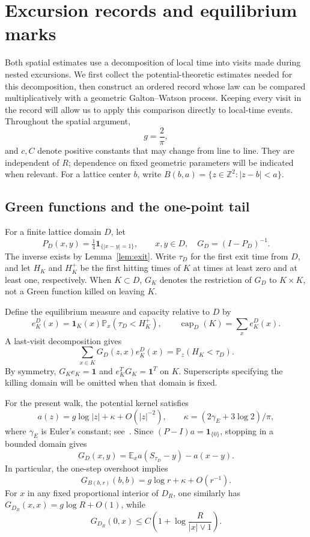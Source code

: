 \documentclass[11pt,a4paper]{article}
\numberwithin{equation}{section}
\theoremstyle{remark}
\begin{document}
\section{Excursion records and equilibrium marks}\label{sec:records}
Both spatial estimates use a decomposition of local time into visits made during nested excursions. We first collect the potential-theoretic estimates needed for this decomposition, then construct an ordered record whose law can be compared multiplicatively with a geometric Galton--Watson process. Keeping every visit in the record will allow us to apply this comparison directly to local-time events. Throughout the spatial argument,
\[
g=\frac2\pi,
\]
and $c,C$ denote positive constants that may change from line to line. They are independent of $R$; dependence on fixed geometric parameters will be indicated when relevant. For a lattice center $b$, write $B(b,a)=\{z\in\mathbb Z^2:|z-b|<a\}$.

\subsection{Green functions and the one-point tail}\label{sec:green}
For a finite lattice domain $D$, let
\[
P_D(x,y)=\tfrac14\mathbf1_{\{|x-y|=1\}},\qquad x,y\in D,
\quad G_D=(I-P_D)^{-1}.
\]
The inverse exists by Lemma~\ref{lem:exit}. Write $\tau_D$ for the first exit time from $D$, and let $H_K$ and $H_K^+$ be the first hitting times of $K$ at times at least zero and at least one, respectively. When $K\subset D$, $G_K$ denotes the restriction of $G_D$ to $K\times K$, not a Green function killed on leaving $K$.

Define the equilibrium measure and capacity relative to $D$ by
\[
e_K^D(x)=\mathbf1_K(x)\mathbb P_x(\tau_D<H_K^+),\qquad
\operatorname{cap}_D(K)=\sum_x e_K^D(x).
\]
A last-visit decomposition gives
\begin{equation}\label{eq:2.4}
\sum_{x\in K}G_D(z,x)e_K^D(x)=\mathbb P_z(H_K<\tau_D).
\end{equation}
By symmetry, $G_Ke_K=\mathbf1$ and $e_K^TG_K=\mathbf1^T$ on $K$. Superscripts specifying the killing domain will be omitted when that domain is fixed.

For the present walk, the potential kernel satisfies
\begin{equation}\label{eq:2.5}
a(z)=g\log|z|+\kappa+O(|z|^{-2}),\qquad
\kappa=(2\gamma_E+3\log2)/\pi,
\end{equation}
where $\gamma_E$ is Euler's constant; see~\cite[Theorem 4.4.4]{LL}. Since $(P-I)a=\mathbf1_{\{0\}}$, stopping in a bounded domain gives
\begin{equation}\label{eq:2.6}
G_D(x,y)=\mathbb E_xa(S_{\tau_D}-y)-a(x-y).
\end{equation}
In particular, the one-step overshoot implies
\begin{equation}\label{eq:2.7}
G_{B(b,r)}(b,b)=g\log r+\kappa+O(r^{-1}).
\end{equation}
For $x$ in any fixed proportional interior of $D_R$, one similarly has $G_{D_R}(x,x)=g\log R+O(1)$, while
\begin{equation}\label{eq:2.8}
G_{D_R}(0,x)\le C\left(1+\log\frac R{|x|\vee1}\right).
\end{equation}
\end{document}
